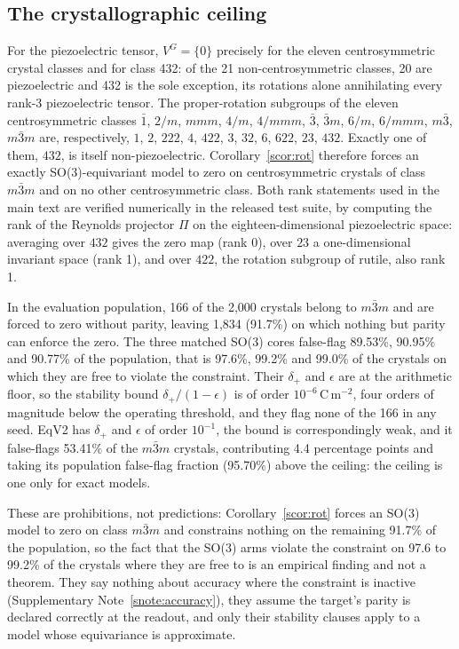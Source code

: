 \subsection*{The crystallographic ceiling}

For the piezoelectric tensor, $V^{G}=\{0\}$ precisely for the eleven centrosymmetric crystal classes and for class 432: of the 21 non-centrosymmetric classes, 20 are piezoelectric and 432 is the sole exception, its rotations alone annihilating every rank-3 piezoelectric tensor\cite{nye1985crystals}. The proper-rotation subgroups of the eleven centrosymmetric classes $\bar 1$, $2/m$, $mmm$, $4/m$, $4/mmm$, $\bar 3$, $\bar 3 m$, $6/m$, $6/mmm$, $m\bar 3$, $m\bar 3 m$ are, respectively, $1$, $2$, $222$, $4$, $422$, $3$, $32$, $6$, $622$, $23$, $432$. Exactly one of them, $432$, is itself non-piezoelectric. Corollary~\ref{scor:rot} therefore forces an exactly SO(3)-equivariant model to zero on centrosymmetric crystals of class $m\bar 3 m$ and on no other centrosymmetric class. Both rank statements used in the main text are verified numerically in the released test suite, by computing the rank of the Reynolds projector $\Pi$ on the eighteen-dimensional piezoelectric space: averaging over $432$ gives the zero map (rank 0), over $23$ a one-dimensional invariant space (rank 1), and over $422$, the rotation subgroup of rutile, also rank 1.

In the evaluation population, 166 of the 2,000 crystals belong to $m\bar 3 m$ and are forced to zero without parity, leaving 1,834 (91.7\%) on which nothing but parity can enforce the zero. The three matched SO(3) cores false-flag 89.53\%, 90.95\% and 90.77\% of the population, that is 97.6\%, 99.2\% and 99.0\% of the crystals on which they are free to violate the constraint. Their $\delta_{+}$ and $\epsilon$ are at the arithmetic floor, so the stability bound $\delta_{+}/(1-\epsilon)$ is of order $10^{-6}$\,C\,m$^{-2}$, four orders of magnitude below the operating threshold, and they flag none of the 166 in any seed. EqV2 has $\delta_{+}$ and $\epsilon$ of order $10^{-1}$, the bound is correspondingly weak, and it false-flags 53.41\% of the $m\bar 3 m$ crystals, contributing 4.4 percentage points and taking its population false-flag fraction (95.70\%) above the ceiling: the ceiling is one only for exact models.

These are prohibitions, not predictions: Corollary~\ref{scor:rot} forces an SO(3) model to zero on class $m\bar 3 m$ and constrains nothing on the remaining 91.7\% of the population, so the fact that the SO(3) arms violate the constraint on 97.6 to 99.2\% of the crystals where they are free to is an empirical finding and not a theorem. They say nothing about accuracy where the constraint is inactive (Supplementary Note~\ref{snote:accuracy}), they assume the target's parity is declared correctly at the readout, and only their stability clauses apply to a model whose equivariance is approximate.


